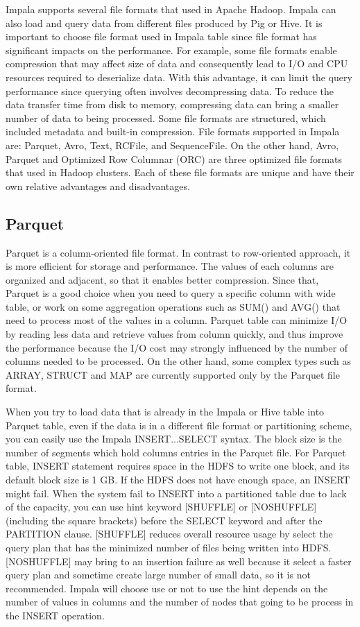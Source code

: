 \documentclass[onecolumn, draftclsnofoot,10pt, compsoc]{IEEEtran}
\begin{document}
Impala supports several file formats that used in Apache Hadoop. 
Impala can also load and query data from different files produced by Pig or Hive. 
It is important to choose file format used in Impala table since file format has significant impacts on the performance.
For example, some file formats enable compression that may affect size of data and consequently lead to I/O and CPU resources required to deserialize data.
With this advantage, it can limit the query performance since querying often involves decompressing data. 
To reduce the data transfer time from disk to memory, compressing data can bring a smaller number of data to being processed. 
Some file formats are structured, which included metadata and built-in compression. 
File formats supported in Impala are: Parquet, Avro, Text, RCFile, and SequenceFile. 
On the other hand, Avro, Parquet and Optimized Row Columnar (ORC) are three optimized file formats that used in Hadoop clusters. 
Each of these file formats are unique and have their own relative advantages and disadvantages.  
        \subsection{Parquet}
Parquet is a column-oriented file format.
In contrast to row-oriented approach, it is more efficient for storage and performance.
The values of each columns are organized and adjacent, so that it enables better compression. 
Since that, Parquet is a good choice when you need to query a specific column with wide table, or work on some aggregation operations such as SUM() and AVG() that need to process most of the values in a column. 
Parquet table can minimize I/O by reading less data and retrieve values from column quickly, and thus improve the performance because the I/O cost may strongly influenced by the number of columns needed to be processed. 
On the other hand, some complex types such as ARRAY, STRUCT and MAP are currently supported only by the Parquet file format. 

When you try to load data that is already in the Impala or Hive table into Parquet table, even if the data is in a different file format or partitioning scheme, you can easily use the Impala INSERT...SELECT syntax.
The block size is the number of segments which hold columns entries in the Parquet file.
For Parquet table, INSERT statement  requires space in the HDFS to write one block, and its default block size is 1 GB.
If the HDFS does not have enough space, an INSERT might fail. When the system fail to INSERT into a partitioned table due to lack of the capacity, you can use hint keyword [SHUFFLE] or [NOSHUFFLE] (including the square brackets) before the SELECT keyword and after the PARTITION clause.
[SHUFFLE] reduces overall resource usage by select the query plan that has the minimized number of files being written into HDFS.
[NOSHUFFLE] may bring to an insertion failure as well because it select a faster query plan and sometime create large number of small data, so it is not recommended. 
Impala will choose use or not to use the hint depends on the number of values in columns and the number of nodes that going to be process in the INSERT operation. 
\end{document}
